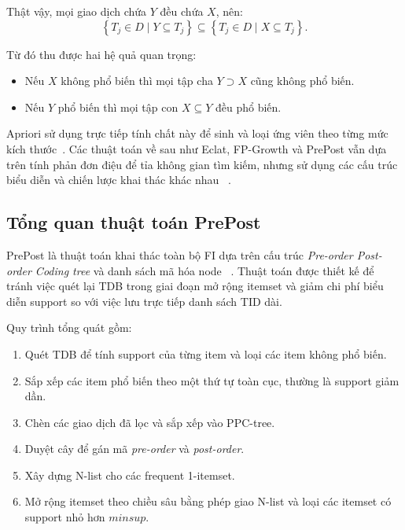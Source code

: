 Thật vậy, mọi giao dịch chứa $Y$ đều chứa $X$, nên:
\begin{equation}
    \left\{T_j \in D \mid Y \subseteq T_j\right\}
    \subseteq
    \left\{T_j \in D \mid X \subseteq T_j\right\}.
    \label{eq:apriori-set-inclusion}
\end{equation}

Từ đó thu được hai hệ quả quan trọng:
\begin{itemize}
    \item Nếu $X$ không phổ biến thì mọi tập cha $Y \supset X$ cũng không phổ biến.
    \item Nếu $Y$ phổ biến thì mọi tập con $X \subseteq Y$ đều phổ biến.
\end{itemize}

Apriori sử dụng trực tiếp tính chất này để sinh và loại ứng viên theo từng mức
kích thước~\cite{agrawal1994fast}. Các thuật toán về sau như Eclat, FP-Growth
và PrePost vẫn dựa trên tính phản đơn điệu để tỉa không gian tìm kiếm, nhưng sử
dụng các cấu trúc biểu diễn và chiến lược khai thác khác nhau
~\cite{zaki2000eclat,han2000fpgrowth,deng2012prepost}.

\subsection{Tổng quan thuật toán PrePost}

PrePost là thuật toán khai thác toàn bộ FI dựa trên cấu trúc
\textit{Pre-order Post-order Coding tree} và danh sách mã hóa node ~\cite{deng2012prepost}. Thuật toán được thiết kế để tránh việc
quét lại TDB trong giai đoạn mở rộng itemset và giảm chi phí biểu diễn support
so với việc lưu trực tiếp danh sách TID dài.

Quy trình tổng quát gồm:
\begin{enumerate}
    \item Quét TDB để tính support của từng item và loại các item không phổ biến.
    \item Sắp xếp các item phổ biến theo một thứ tự toàn cục, thường là support
          giảm dần.
    \item Chèn các giao dịch đã lọc và sắp xếp vào PPC-tree.
    \item Duyệt cây để gán mã \textit{pre-order} và \textit{post-order}.
    \item Xây dựng N-list cho các frequent 1-itemset.
    \item Mở rộng itemset theo chiều sâu bằng phép giao N-list và loại các
          itemset có support nhỏ hơn $\mathit{minsup}$.
\end{enumerate}

